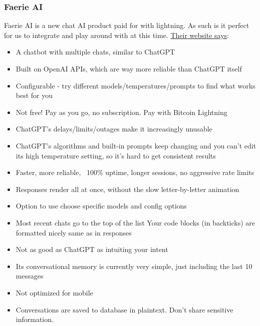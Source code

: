\subsubsection{Faerie AI}
Faerie AI is a new chat AI product paid for with lightning. As such is it perfect for us to integrate and play around with at this time. \href{https://faerie.ai/}{Their website says}:
\begin{itemize}
\item A chatbot with multiple chats, similar to ChatGPT
\item Built on OpenAI APIs, which are way more reliable than ChatGPT itself
\item Configurable - try different models/temperatures/prompts to find what works best for you
\item Not free! Pay as you go, no subscription.
Pay with Bitcoin Lightning
\item ChatGPT's delays/limits/outages make it increasingly unusable
\item ChatGPT's algorithms and built-in prompts keep changing and you can't edit its high temperature setting, so it's hard to get consistent results
\item Faster, more reliable, ~100\% uptime, longer sessions, no aggressive rate limits
\item Responses render all at once, without the slow letter-by-letter animation
\item Option to use choose specific models and config options
\item Most recent chats go to the top of the list
Your code blocks (in backticks) are formatted nicely same as in responses
\item Not as good as ChatGPT as intuiting your intent
\item Its conversational memory is currently very simple, just including the last 10 messages
\item Not optimized for mobile
\item Conversations are saved to database in plaintext. Don't share sensitive information.
\end{itemize}
